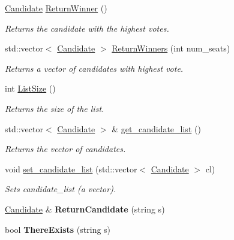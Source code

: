 \begin{DoxyCompactItemize}
\mbox{\label{class_candidate_list_a3430f7e5c361bde4ae4f1cae3aee0c15}} 
\mbox{\hyperlink{class_candidate}{Candidate}} \mbox{\hyperlink{class_candidate_list_a3430f7e5c361bde4ae4f1cae3aee0c15}{Return\+Winner}} ()
\begin{DoxyCompactList}\small\item\em Returns the candidate with the highest votes. \end{DoxyCompactList}\item 
std\+::vector$<$ \mbox{\hyperlink{class_candidate}{Candidate}} $>$ \mbox{\hyperlink{class_candidate_list_abfdc825213700c4fe146dba1ec599d0d}{Return\+Winners}} (int num\+\_\+seats)
\begin{DoxyCompactList}\small\item\em Returns a vector of candidates with highest vote. \end{DoxyCompactList}\item 
\mbox{\label{class_candidate_list_abc2c790e8597f07e047bdb73e981da52}} 
int \mbox{\hyperlink{class_candidate_list_abc2c790e8597f07e047bdb73e981da52}{List\+Size}} ()
\begin{DoxyCompactList}\small\item\em Returns the size of the list. \end{DoxyCompactList}\item 
\mbox{\label{class_candidate_list_ad1af8464cd59a666efe876302d79b043}} 
std\+::vector$<$ \mbox{\hyperlink{class_candidate}{Candidate}} $>$ \& \mbox{\hyperlink{class_candidate_list_ad1af8464cd59a666efe876302d79b043}{get\+\_\+candidate\+\_\+list}} ()
\begin{DoxyCompactList}\small\item\em Returns the vector of candidates. \end{DoxyCompactList}\item 
void \mbox{\hyperlink{class_candidate_list_a541bbc8c8b05edadc46c72567a5c446a}{set\+\_\+candidate\+\_\+list}} (std\+::vector$<$ \mbox{\hyperlink{class_candidate}{Candidate}} $>$ cl)
\begin{DoxyCompactList}\small\item\em Sets candidate\+\_\+list (a vector). \end{DoxyCompactList}\item 
\mbox{\label{class_candidate_list_ae2aec43811ad71df57b14cd234cad959}} 
\mbox{\hyperlink{class_candidate}{Candidate}} \& {\bfseries Return\+Candidate} (string s)
\item 
\mbox{\label{class_candidate_list_a130f3c30b4800fc768674497272b91fb}} 
bool {\bfseries There\+Exists} (string s)
\end{DoxyCompactItemize}


